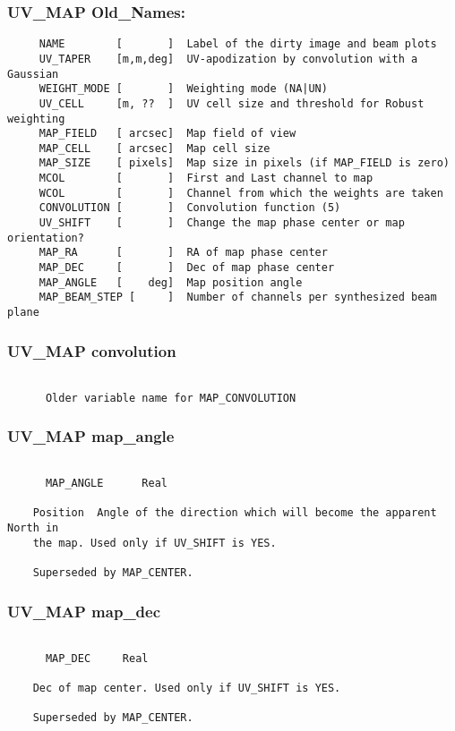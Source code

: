 \subsubsection{UV\_MAP Old\_Names:}
\begin{verbatim}
     NAME        [       ]  Label of the dirty image and beam plots
     UV_TAPER    [m,m,deg]  UV-apodization by convolution with a Gaussian
     WEIGHT_MODE [       ]  Weighting mode (NA|UN)
     UV_CELL     [m, ??  ]  UV cell size and threshold for Robust weighting
     MAP_FIELD   [ arcsec]  Map field of view
     MAP_CELL    [ arcsec]  Map cell size
     MAP_SIZE    [ pixels]  Map size in pixels (if MAP_FIELD is zero)
     MCOL        [       ]  First and Last channel to map
     WCOL        [       ]  Channel from which the weights are taken
     CONVOLUTION [       ]  Convolution function (5)
     UV_SHIFT    [       ]  Change the map phase center or map orientation?
     MAP_RA      [       ]  RA of map phase center
     MAP_DEC     [       ]  Dec of map phase center
     MAP_ANGLE   [    deg]  Map position angle
     MAP_BEAM_STEP [     ]  Number of channels per synthesized beam plane

\end{verbatim}
\subsubsection{UV\_MAP convolution}
\begin{verbatim}

      Older variable name for MAP_CONVOLUTION

\end{verbatim}
\subsubsection{UV\_MAP map\_angle}
\begin{verbatim}

      MAP_ANGLE      Real

    Position  Angle of the direction which will become the apparent North in
    the map. Used only if UV_SHIFT is YES.

    Superseded by MAP_CENTER.

\end{verbatim}
\subsubsection{UV\_MAP map\_dec}
\begin{verbatim}

      MAP_DEC     Real

    Dec of map center. Used only if UV_SHIFT is YES.

    Superseded by MAP_CENTER.

\end{verbatim}
